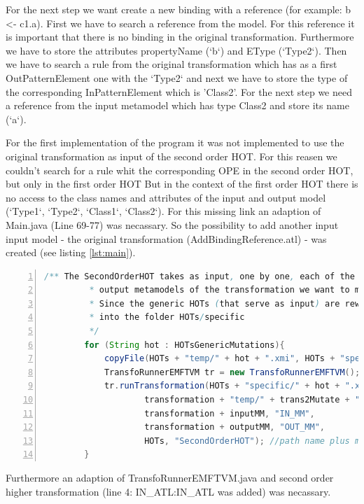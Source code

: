 \documentclass{llncs}
\begin{document}
For the next step we want create a new binding with a reference (for example: b <- c1.a).
First we have to search a reference from the model. For this reference it is
important that there is no binding in the original transformation. Furthermore
we have to store the attributes propertyName (`b`) and EType (`Type2`). 
Then we have to search a rule from the original transformation which
has as a first OutPatternElement one with the `Type2` and next we have to store the type of the corresponding InPatternElement which is 'Class2'.
For the next step we need a reference from the input metamodel which
has type Class2 and store its name (`a`). \par

For the first implementation of the program it was not implemented to use the original transformation as input of 
the second order HOT.
For this reasen we couldn't search for a rule whit the corresponding OPE in the second order HOT, but only in the first order HOT
But in the context of the first order HOT there is no access to the class names and attributes of the
input and output model (`Type1`, `Type2`, `Class1`, `Class2`). 
For this missing link an adaption of Main.java (Line 69-77) was necassary. So the possibility to add another input input model - the original transformation
(AddBindingReference.atl) - was created (see listing \ref{lst:main}).

\begin{lstlisting}[language=Java, numbers=left,xleftmargin=5.0ex,
caption=Adaptioon of Main.java., label=lst:main] 
/** The SecondOrderHOT takes as input, one by one, each of the generic HOTs (together with the input and
		 * output metamodels of the transformation we want to mutate) and generates one specific mutation for each of the generic ones.
		 * Since the generic HOTs (that serve as input) are rewritten by the in-place SecondOrderHOT, we first copy them
		 * into the folder HOTs/specific
		 */
		for (String hot : HOTsGenericMutations){
			copyFile(HOTs + "temp/" + hot + ".xmi", HOTs + "specific/" + hot + ".xmi");
			TransfoRunnerEMFTVM tr = new TransfoRunnerEMFTVM();
			tr.runTransformation(HOTs + "specific/" + hot + ".xmi", "ATL",
					transformation + "temp/" + trans2Mutate + ".xmi", "IN_ATL",
					transformation + inputMM, "IN_MM",					
					transformation + outputMM, "OUT_MM",
					HOTs, "SecondOrderHOT"); //path name plus module name of the transformation
		}	
\end{lstlisting}

Furthermore an adaption of TransfoRunnerEMFTVM.java and second order higher
transformation (line 4: IN\_ATL:IN\_ATL was added) was necassary.
\end{document}
